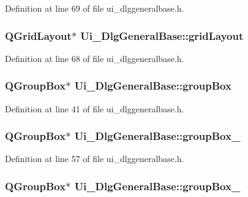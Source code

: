 Definition at line 69 of file ui\+\_\+dlggeneralbase.\+h.

\hypertarget{classUi__DlgGeneralBase_ae149cf7331bb8bdd9c3f8dabdde003e4}{
\subsubsection[{grid\+Layout}]{\setlength{\rightskip}{0pt plus 5cm}Q\+Grid\+Layout$\ast$ Ui\+\_\+\+Dlg\+General\+Base\+::grid\+Layout}}\label{classUi__DlgGeneralBase_ae149cf7331bb8bdd9c3f8dabdde003e4}


Definition at line 68 of file ui\+\_\+dlggeneralbase.\+h.

\hypertarget{classUi__DlgGeneralBase_aa25408255cc1bc3b6d720b58ceb42e32}{
\subsubsection[{group\+Box}]{\setlength{\rightskip}{0pt plus 5cm}Q\+Group\+Box$\ast$ Ui\+\_\+\+Dlg\+General\+Base\+::group\+Box}}\label{classUi__DlgGeneralBase_aa25408255cc1bc3b6d720b58ceb42e32}


Definition at line 41 of file ui\+\_\+dlggeneralbase.\+h.

\hypertarget{classUi__DlgGeneralBase_ae822e688fc0f616b4a29511bc5615a3d}{
\subsubsection[{group\+Box\+\_\+2}]{\setlength{\rightskip}{0pt plus 5cm}Q\+Group\+Box$\ast$ Ui\+\_\+\+Dlg\+General\+Base\+::group\+Box\+\_}}\label{classUi__DlgGeneralBase_ae822e688fc0f616b4a29511bc5615a3d}


Definition at line 57 of file ui\+\_\+dlggeneralbase.\+h.

\hypertarget{classUi__DlgGeneralBase_a14484da34e83830a42cd4929ba2c7d86}{
\subsubsection[{group\+Box\+\_\+3}]{\setlength{\rightskip}{0pt plus 5cm}Q\+Group\+Box$\ast$ Ui\+\_\+\+Dlg\+General\+Base\+::group\+Box\+\_}}\label{classUi__DlgGeneralBase_a14484da34e83830a42cd4929ba2c7d86}



